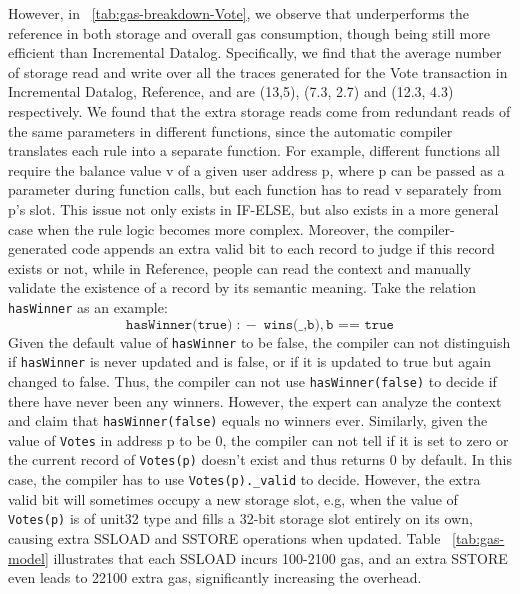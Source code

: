 However, in ~\ref{tab:gas-breakdown-Vote}, we observe that \proto underperforms the reference in both storage and overall gas consumption, though being still more efficient than {\sf Incremental Datalog}. Specifically, we find that the average number of storage read and write over all the traces generated for the Vote transaction in {\sf Incremental Datalog}, {\sf Reference}, and \proto are (13,5), (7.3, 2.7) and (12.3, 4.3) respectively.
We found that the extra storage reads come from redundant reads of the same parameters in different functions, since the automatic compiler translates each rule into a separate function. For example, different functions all require the balance value v of a given user address p, where p can be passed as a parameter during function calls, but each function has to read v separately from p's slot. This issue not only exists in IF-ELSE, but also exists in a more general case when the rule logic becomes more complex.
Moreover, the compiler-generated code appends an extra valid bit to each record to judge if this record exists or not, while in {\sf Reference}, people can read the context and manually validate the existence of a record by its semantic meaning. 
Take the relation {\sf \lstinline{hasWinner}} as an example:
\[
\texttt{hasWinner(true)} \;:\!- \;
    \texttt{wins(\_,b)}, \texttt{b == true}
\]
Given the default value of {\sf \lstinline{hasWinner}} to be false, the compiler can not distinguish if {\sf \lstinline{hasWinner}} is never updated and is false, or if it is updated to true but again changed to false. Thus, the compiler can not use {\sf \lstinline{hasWinner(false)}} to decide if there have never been any winners. However, the expert can analyze the context and claim that {\sf \lstinline{hasWinner(false)}} equals no winners ever. 
Similarly, given the value of {\sf \lstinline{Votes}} in address p to be 0, the compiler can not tell if it is set to zero or the current record of {\sf \lstinline{Votes(p)}} doesn't exist and thus returns 0 by default. In this case, the compiler has to use {\sf \lstinline{Votes(p)._valid}} to decide.
However, the extra valid bit will sometimes occupy a new storage slot, e.g, when the value of {\sf \lstinline{Votes(p)}} is of unit32 type and fills a 32-bit storage slot entirely on its own, causing extra SSLOAD and SSTORE operations when updated.
Table ~\ref{tab:gas-model} illustrates that each SSLOAD incurs 100-2100 gas, and an extra SSTORE even leads to 22100 extra gas, significantly increasing the overhead. 

